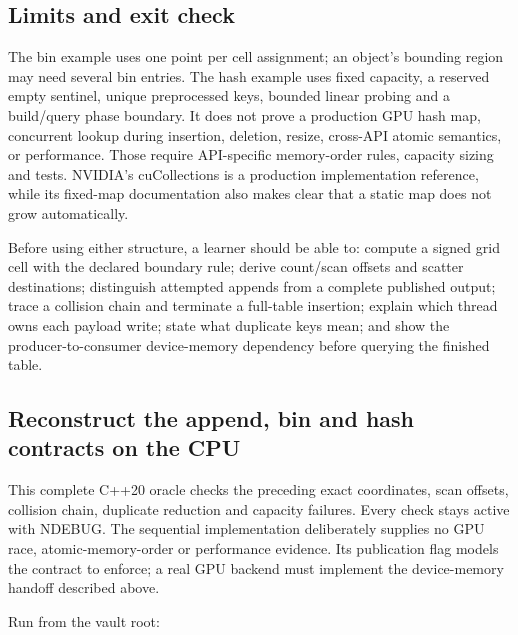 \subsection{Limits and exit check}\label{03-visual-computing-i-ch016-limits-and-exit-check}

\hypertarget{03-visual-computing-i-ch016-limits-and-exit-check}{}

The bin example uses one point per cell assignment; an object's bounding region may need several bin entries. The hash example uses fixed capacity, a reserved empty sentinel, unique preprocessed keys, bounded linear probing and a build/query phase boundary. It does not prove a production GPU hash map, concurrent lookup during insertion, deletion, resize, cross-API atomic semantics, or performance. Those require API-specific memory-order rules, capacity sizing and tests. NVIDIA's cuCollections is a production implementation reference, while its fixed-map documentation also makes clear that a static map does not grow automatically.

Before using either structure, a learner should be able to: compute a signed grid cell with the declared boundary rule; derive count/scan offsets and scatter destinations; distinguish attempted appends from a complete published output; trace a collision chain and terminate a full-table insertion; explain which thread owns each payload write; state what duplicate keys mean; and show the producer-to-consumer device-memory dependency before querying the finished table.

\subsection{Reconstruct the append, bin and hash contracts on the CPU}\label{03-visual-computing-i-ch016-reconstruct-the-append-bin-and-hash-contracts-on-the-cpu}

\hypertarget{03-visual-computing-i-ch016-reconstruct-the-append-bin-and-hash-contracts-on-the-cpu}{}

This complete C++20 oracle checks the preceding exact coordinates, scan offsets, collision chain, duplicate reduction and capacity failures. Every check stays active with NDEBUG. The sequential implementation deliberately supplies no GPU race, atomic-memory-order or performance evidence. Its publication flag models the contract to enforce; a real GPU backend must implement the device-memory handoff described above.

Run from the vault root:

